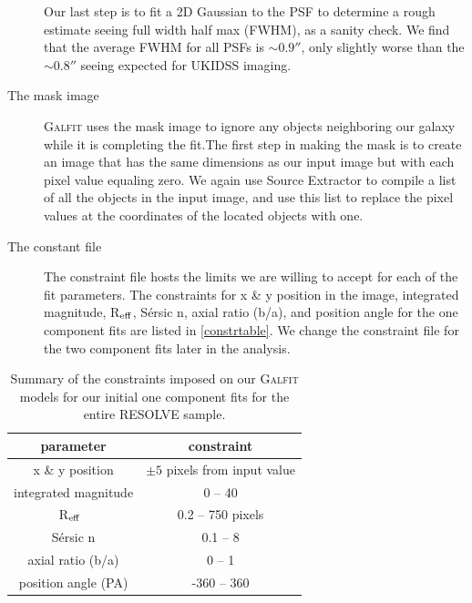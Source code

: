 \documentclass[iop,apj]{emulateapj}
\newcommand{\Reff}{R$_{\rm eff}$}
\begin{document}
\begin{description}
{\begin{enumerate}
\end{enumerate}

Our last step is to fit a 2D Gaussian to the PSF to determine a rough estimate seeing full width half max (FWHM), as a sanity check. We find that the average FWHM for all PSFs is $\sim 0.9''$, only slightly worse than the $\sim 0.8''$ seeing expected for UKIDSS imaging.}

\item[The mask image]{\textsc{Galfit} uses the mask image to ignore any objects neighboring our galaxy while it is completing the fit.The first step in making the mask is to create an image that has the same dimensions as our input image but with each pixel value equaling zero. We again use Source Extractor to compile a list of all the objects in the input image, and  use this list to replace the pixel values at the coordinates of the located objects with one.}

\item[The constant file]{The constraint file hosts the limits we are willing to accept for each of the fit parameters. The constraints for x \& y position in the image, integrated magnitude, \Reff, S\'ersic n, axial ratio (b/a), and position angle for the one component fits are listed in \autoref{constrtable}. We change the constraint file for the two component fits later in the analysis.}

\end{description}

\begin{table}[htdp]
\begin{center}
\begin{tabular}{cc} \hline
parameter & constraint  \\ \hline
x \& y position & $\pm5$ pixels from input value \\
integrated magnitude & 0 -- 40 \\ 
\Reff\ & 0.2 -- 750 pixels \\ 
S\'ersic n & 0.1 -- 8 \\ 
axial ratio (b/a) & 0 -- 1 \\
position angle (PA) & -360 -- 360 \\ \hline
\end{tabular}
\end{center}
\caption{Summary of the constraints imposed on our \textsc{Galfit} models for our initial one component fits for the entire RESOLVE sample.}
\label{constrtable}
\end{table}%
\end{document}
